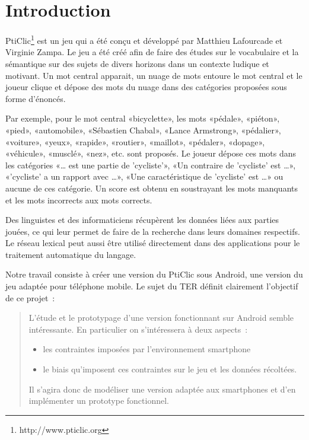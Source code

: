 \documentclass[a4paper,11pt,french]{article}
\def\android{Android\texttrademark{}}
\begin{document}
\section{Introduction}

PtiClic\footnote{http://www.pticlic.org} est un jeu qui a été conçu et développé par Matthieu Lafourcade et Virginie Zampa. Le jeu a été créé afin de faire des études sur le vocabulaire et la sémantique sur des sujets de divers horizons dans un contexte ludique et motivant. Un mot central apparait, un nuage de mots entoure le mot central et le joueur clique et dépose des mots du nuage dans des catégories proposées sous forme d'énoncés. 

Par exemple, pour le mot central «bicyclette», les mots «pédale», «piéton», «pied», «automobile», «Sébastien Chabal», «Lance Armstrong», «pédalier», «voiture», «yeux», «rapide», «routier», «maillot», «pédaler», «dopage», «véhicule», «musclé», «nez», etc. sont proposés. Le joueur dépose ces mots dans les catégories «\dots{} est une partie de 'cycliste'», «Un contraire de 'cycliste' est \dots{}», «'cycliste' a un rapport avec \dots{}»,  «Une caractéristique de 'cycliste' est \dots{}» ou aucune de ces catégorie. Un score est obtenu en soustrayant les mots manquants et les mots incorrects aux mots corrects. 

Des linguistes et des informaticiens récupèrent les données liées aux parties jouées, ce qui leur permet de faire de la recherche dans leurs domaines respectifs. Le réseau lexical peut aussi être utilisé directement dans des applications pour le traitement automatique du langage.

Notre travail consiste à créer une version du PtiClic sous \android{}, une version du jeu adaptée pour téléphone mobile. Le sujet du TER définit clairement l'objectif de ce projet~:

\begin{quotation}
\noindent  L'étude et le prototypage d'une version fonctionnant sur \android{} semble intéressante. En particulier on s'intéressera à deux aspects~:
  \begin{itemize}
  \item les contraintes imposées par l'environnement smartphone
  \item le biais qu'imposent ces contraintes sur le jeu et les données récoltées.
  \end{itemize}
  
\noindent  Il s'agira donc de modéliser une version adaptée aux smartphones et d'en implémenter un prototype fonctionnel.
\end{quotation}
\end{document}
